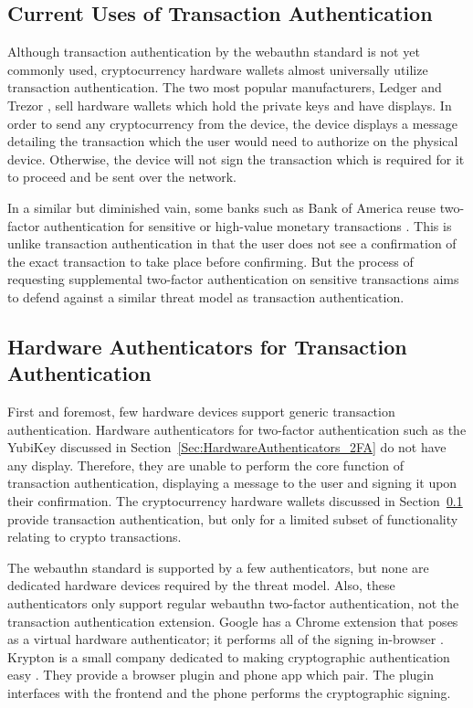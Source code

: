 \subsection{Current Uses of Transaction Authentication}\label{Sec:CurrentUses_txAuthn}

Although transaction authentication by the webauthn standard is not yet commonly used, cryptocurrency hardware wallets almost universally utilize transaction authentication. The two most popular manufacturers, Ledger \cite{https://www.ledger.com/} and Trezor \cite{https://trezor.io/}, sell hardware wallets which hold the private keys and have displays. In order to send any cryptocurrency from the device, the device displays a message detailing the transaction which the user would need to authorize on the physical device. Otherwise, the device will not sign the transaction which is required for it to proceed and be sent over the network.

In a similar but diminished vain, some banks such as Bank of America reuse two-factor authentication for sensitive or high-value monetary transactions \cite{https://www.eff.org/deeplinks/2016/12/how-enable-two-factor-authentication-bank-america}. This is unlike transaction authentication in that the user does not see a confirmation of the exact transaction to take place before confirming. But the process of requesting supplemental two-factor authentication on sensitive transactions aims to defend against a similar threat model as transaction authentication.

\subsection{Hardware Authenticators for \newline Transaction Authentication}

First and foremost, few hardware devices support generic transaction authentication. Hardware authenticators for two-factor authentication such as the YubiKey discussed in Section~\ref{Sec:HardwareAuthenticators_2FA} do not have any display. Therefore, they are unable to perform the core function of transaction authentication, displaying a message to the user and signing it upon their confirmation. The cryptocurrency hardware wallets discussed in Section~\ref{Sec:CurrentUses_txAuthn} provide transaction authentication, but only for a limited subset of functionality relating to crypto transactions.  

The webauthn standard is supported by a few authenticators, but none are dedicated hardware devices required by the threat model. Also, these authenticators only support regular webauthn two-factor authentication, not the transaction authentication extension. Google has a Chrome extension that poses as a virtual hardware authenticator; it performs all of the signing in-browser \cite{https://github.com/google/virtual-authenticators-tab}. Krypton is a small company dedicated to making cryptographic authentication easy \cite{https://krypt.co/}. They provide a browser plugin and phone app which pair. The plugin interfaces with the frontend and the phone performs the cryptographic signing. 

